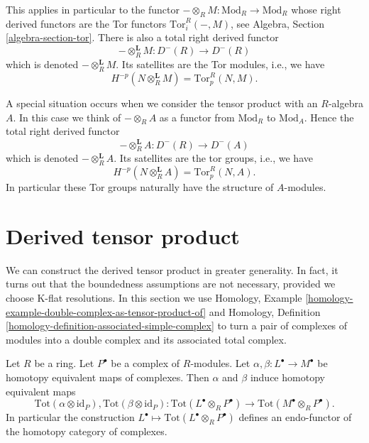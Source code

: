 \medskip\noindent
This applies in particular to the functor
$ - \otimes_R M : \text{Mod}_R \to \text{Mod}_R$
whose right derived functors are the Tor functors $\text{Tor}_i^R(-, M)$, see
Algebra, Section \ref{algebra-section-tor}.
There is also a total right derived functor
\begin{equation}
\label{equation-derived-tensor-module}
-\otimes_R^{\mathbf{L}} M :
D^{-}(R)
\longrightarrow
D^{-}(R)
\end{equation}
which is denoted $-\otimes_R^{\mathbf{L}} M$. Its satellites are the
Tor modules, i.e., we have
$$
H^{-p}(N \otimes_R^{\mathbf{L}} M) = \text{Tor}_p^R(N, M).
$$

\medskip\noindent
A special situation occurs when we consider the tensor product with
an $R$-algebra $A$. In this case we think of $- \otimes_R A$
as a functor from $\text{Mod}_R$ to $\text{Mod}_A$. Hence the total
right derived functor
\begin{equation}
\label{equation-derived-tensor-algebra}
-\otimes_R^{\mathbf{L}} A :
D^{-}(R)
\longrightarrow
D^{-}(A)
\end{equation}
which is denoted $-\otimes_R^{\mathbf{L}} A$. Its satellites are the
tor groups, i.e., we have
$$
H^{-p}(N \otimes_R^{\mathbf{L}} A) = \text{Tor}_p^R(N, A).
$$
In particular these Tor groups naturally have the structure of $A$-modules.







\section{Derived tensor product}
\label{section-derived-tensor-product}

\noindent
We can construct the derived tensor product in greater generality.
In fact, it turns out that the boundedness assumptions are not
necessary, provided we choose K-flat resolutions.
In this section we use Homology, Example
\ref{homology-example-double-complex-as-tensor-product-of}
and
Homology, Definition \ref{homology-definition-associated-simple-complex}
to turn a pair of complexes of modules into a double complex
and its associated total complex.

\begin{lemma}
\label{lemma-derived-tor-homotopy}
Let $R$ be a ring.
Let $P^\bullet$ be a complex of $R$-modules.
Let $\alpha, \beta : L^\bullet \to M^\bullet$ be homotopy equivalent
maps of complexes. Then $\alpha$ and $\beta$ induce homotopy equivalent
maps
$$
\text{Tot}(\alpha \otimes \text{id}_P),
\text{Tot}(\beta \otimes \text{id}_P) :
\text{Tot}(L^\bullet \otimes_R P^\bullet)
\longrightarrow
\text{Tot}(M^\bullet \otimes_R P^\bullet).
$$
In particular the construction
$L^\bullet \mapsto \text{Tot}(L^\bullet \otimes_R P^\bullet)$
defines an endo-functor of the homotopy category of complexes.
\end{lemma}

